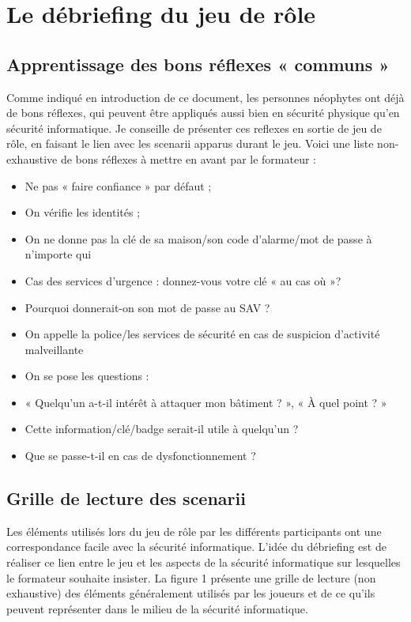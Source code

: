 \documentclass[11pt]{article} %
\begin{document}
\section{Le débriefing du jeu de rôle}
\subsection{Apprentissage des bons réflexes « communs » } 
Comme indiqué en introduction de ce document, les personnes néophytes 
ont déjà de bons réflexes, qui peuvent être appliqués aussi bien en sécurité
physique qu'en sécurité informatique. Je conseille de présenter ces reflexes en
sortie de jeu de rôle, en faisant le lien avec les scenarii apparus durant le
jeu. Voici une liste non-exhaustive de bons réflexes à mettre en avant par le
formateur :

\begin{itemize}
\item	Ne pas « faire confiance » par défaut ;
\item On vérifie les identités ;
\item On ne donne pas la clé de sa maison/son code d'alarme/mot de passe à
n'importe qui
\item	Cas des services d'urgence : donnez-vous votre clé « au cas où »?
\item	Pourquoi donnerait-on son mot de passe au SAV ?
\item On appelle la police/les services de sécurité en cas de suspicion
d'activité malveillante
\item	On se pose les questions : 
\item	« Quelqu'un a-t-il intérêt à attaquer mon bâtiment ? », « À quel point ? »
\item	Cette information/clé/badge serait-il utile à quelqu'un ?
\item	Que se passe-t-il en cas de dysfonctionnement ?
\end{itemize}

\subsection{Grille de lecture des scenarii}

Les éléments utilisés lors du jeu de rôle par les différents participants
ont une correspondance facile avec la sécurité informatique. L'idée du
débriefing est de réaliser ce lien entre le jeu et les aspects de la sécurité
informatique sur lesquelles le formateur souhaite insister. La figure 1 présente 
une grille de lecture (non exhaustive) des éléments généralement utilisés par les joueurs et
de ce qu'ils peuvent représenter dans le milieu de la sécurité informatique.
\end{document}
